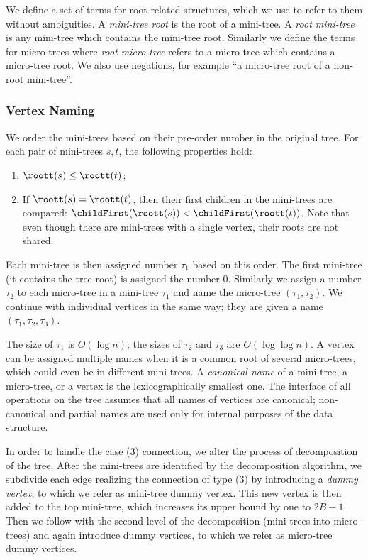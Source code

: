 We define a set of terms for root related structures, which we use to refer to them without ambiguities.
A \emph{mini-tree root} is the root of a mini-tree.
A \emph{root mini-tree} is any mini-tree which contains the mini-tree root.
Similarly we define the terms for micro-trees where \emph{root micro-tree} refers to a micro-tree which contains a micro-tree root.
We also use negations, for example ``a micro-tree root of a non-root mini-tree''.

\subsubsection{Vertex Naming}

We order the mini-trees based on their pre-order number in the original tree.
For each pair of mini-trees $s, t$, the following properties hold:
\begin{enumerate}
	\item $\roott(s) \le \roott(t)$;
	\item If $\roott(s) = \roott(t)$, then their first children in the mini-trees are compared: $ \childFirst(\roott(s)) < \childFirst(\roott(t))$.
	Note that even though there are mini-trees with a single vertex, their roots are not shared.
\end{enumerate}

Each mini-tree is then assigned number $\tau_1$ based on this order.
The first mini-tree (it contains the tree root) is assigned the number $0$.
Similarly we assign a number $\tau_2$ to each micro-tree in a mini-tree $\tau_1$ and name the micro-tree $(\tau_1, \tau_2)$.
We continue with individual vertices in the same way; they are given a name $(\tau_1, \tau_2, \tau_3)$.

The size of $\tau_1$ is $O(\log n)$; the sizes of $\tau_2$ and $\tau_3$ are $O(\log \log n)$.
A vertex can be assigned multiple names when it is a common root of several micro-trees, which could even be in different mini-trees.
A \emph{canonical name} of a mini-tree, a micro-tree, or a vertex is the lexicographically smallest one.
The interface of all operations on the tree assumes that all names of vertices are canonical; non-canonical and partial names are used only for internal purposes of the data structure.

In order to handle the case (3) connection, we alter the process of decomposition of the tree.
After the mini-trees are identified by the decomposition algorithm, we subdivide each edge realizing the connection of type (3) by introducing a \emph{dummy vertex}, to which we refer as mini-tree dummy vertex.
This new vertex is then added to the top mini-tree, which increases its upper bound by one to $2 B - 1$.
Then we follow with the second level of the decomposition (mini-trees into micro-trees) and again introduce dummy vertices, to which we refer as micro-tree dummy vertices.

